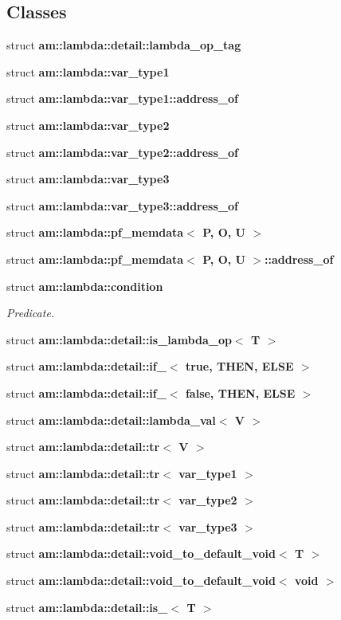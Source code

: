 \subsection*{Classes}
\begin{CompactItemize}
\item 
struct {\bf am::lambda::detail::lambda\_\-op\_\-tag}
\item 
struct {\bf am::lambda::var\_\-type1}
\item 
struct {\bf am::lambda::var\_\-type1::address\_\-of}
\item 
struct {\bf am::lambda::var\_\-type2}
\item 
struct {\bf am::lambda::var\_\-type2::address\_\-of}
\item 
struct {\bf am::lambda::var\_\-type3}
\item 
struct {\bf am::lambda::var\_\-type3::address\_\-of}
\item 
struct {\bf am::lambda::pf\_\-memdata$<$ P, O, U $>$}
\item 
struct {\bf am::lambda::pf\_\-memdata$<$ P, O, U $>$::address\_\-of}
\item 
struct {\bf am::lambda::condition}
\begin{CompactList}\small\item\em Predicate. \item\end{CompactList}\item 
struct {\bf am::lambda::detail::is\_\-lambda\_\-op$<$ T $>$}
\item 
struct \textbf{am::lambda::detail::if\_\-$<$ true, THEN, ELSE $>$}
\item 
struct \textbf{am::lambda::detail::if\_\-$<$ false, THEN, ELSE $>$}
\item 
struct {\bf am::lambda::detail::lambda\_\-val$<$ V $>$}
\item 
struct {\bf am::lambda::detail::tr$<$ V $>$}
\item 
struct {\bf am::lambda::detail::tr$<$ var\_\-type1 $>$}
\item 
struct {\bf am::lambda::detail::tr$<$ var\_\-type2 $>$}
\item 
struct {\bf am::lambda::detail::tr$<$ var\_\-type3 $>$}
\item 
struct \textbf{am::lambda::detail::void\_\-to\_\-default\_\-void$<$ T $>$}
\item 
struct \textbf{am::lambda::detail::void\_\-to\_\-default\_\-void$<$ void $>$}
\item 
struct \textbf{am::lambda::detail::is\_\-$<$ T $>$}

\end{CompactItemize}
